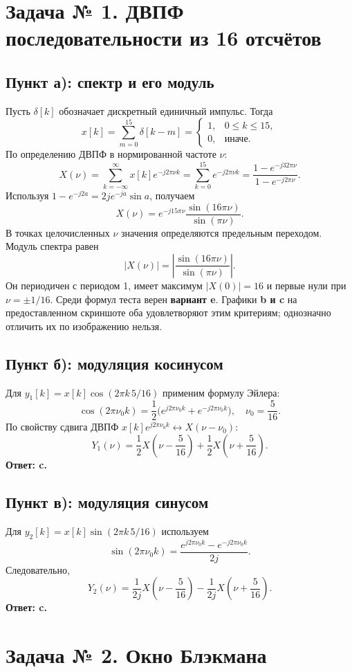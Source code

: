 \documentclass[12pt,a4paper]{article}
\newcommand{\dd}{\delta}
\begin{document}
\section*{Задача № 1. ДВПФ последовательности из 16 отсчётов}
\subsection*{Пункт а): спектр и его модуль}
Пусть $\dd[k]$ обозначает дискретный единичный импульс. Тогда
\[
 x[k]=\sum_{m=0}^{15}\dd[k-m]
 =\begin{cases}1,&0\le k\le15,\\0,&\text{иначе}.\end{cases}
\]
По определению ДВПФ в нормированной частоте $\nu$:
\[
 X(\nu)=\sum_{k=-\infty}^{\infty}x[k]e^{-j2\pi\nu k}
 =\sum_{k=0}^{15}e^{-j2\pi\nu k}
 =\frac{1-e^{-j32\pi\nu}}{1-e^{-j2\pi\nu}}.
\]
Используя $1-e^{-j2a}=2je^{-ja}\sin a$, получаем
\[
 \boxed{X(\nu)=e^{-j15\pi\nu}\frac{\sin(16\pi\nu)}{\sin(\pi\nu)}}.
\]
В точках целочисленных $\nu$ значения определяются предельным переходом.
Модуль спектра равен
\[
 \boxed{|X(\nu)|=\left|\frac{\sin(16\pi\nu)}{\sin(\pi\nu)}\right|}.
\]
Он периодичен с периодом 1, имеет максимум $|X(0)|=16$ и первые нули
при $\nu=\pm1/16$. Среди формул теста верен \textbf{вариант e}.
Графики \textbf{b и c} на предоставленном скриншоте оба удовлетворяют
этим критериям; однозначно отличить их по изображению нельзя.

\subsection*{Пункт б): модуляция косинусом}
Для $y_1[k]=x[k]\cos(2\pi k\,5/16)$ применим формулу Эйлера:
\[
 \cos(2\pi\nu_0k)=\frac12\bigl(e^{j2\pi\nu_0k}+e^{-j2\pi\nu_0k}\bigr),
 \quad\nu_0=\frac5{16}.
\]
По свойству сдвига ДВПФ $x[k]e^{j2\pi\nu_0k}\longleftrightarrow X(\nu-\nu_0)$:
\[
 \boxed{Y_1(\nu)=\frac12X\left(\nu-\frac5{16}\right)
 +\frac12X\left(\nu+\frac5{16}\right)}.
\]
\textbf{Ответ: c.}

\subsection*{Пункт в): модуляция синусом}
Для $y_2[k]=x[k]\sin(2\pi k\,5/16)$ используем
\[
 \sin(2\pi\nu_0k)=\frac{e^{j2\pi\nu_0k}-e^{-j2\pi\nu_0k}}{2j}.
\]
Следовательно,
\[
 \boxed{Y_2(\nu)=\frac1{2j}X\left(\nu-\frac5{16}\right)
 -\frac1{2j}X\left(\nu+\frac5{16}\right)}.
\]
\textbf{Ответ: c.}

\section*{Задача № 2. Окно Блэкмана}
\end{document}
